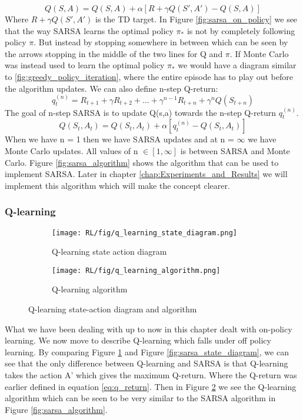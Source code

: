 \begin{equation}
	Q(S,A) = Q(S,A) + \alpha[R+\gamma Q(S',A') - Q(S,A)]
	\label{eq:sarsa_update}
\end{equation}
Where $R+\gamma Q(S',A')$ is the TD target. In Figure \ref{fig:sarsa_on_policy} we see that the way SARSA learns the optimal policy $\pi_{*}$ is not by completely following policy $\pi$. But instead by stopping somewhere in between which can be seen by the arrows stopping in the middle of the two lines for Q and $\pi$. If Monte Carlo was instead used to learn the optimal policy $\pi_{*}$ we would have a diagram similar to \ref{fig:greedy_policy_iteration}, where the entire episode has to play out before the algorithm updates.
We can also define n-step Q-return:
\begin{equation}
	q_{t}^{(n)} = R_{t+1} + \gamma R_{t+2} +...+ \gamma^{n-1}R_{t+n}+\gamma^{n}Q(S_{t+n})
	\label{eq:q_return}
\end{equation}
The goal of n-step SARSA is to update Q(s,a) towards the n-step Q-return $q_t^{(n)}$.
\begin{equation}
	Q(S_t,A_t) = Q(S_t,A_t) + \alpha[q_{t}^{(n)} - Q(S_t,A_t)]
	\label{eq:sarsa_n_step}
\end{equation}
When we have n = 1 then we have SARSA updates and at n = $\infty$ we have Monte Carlo updates. All values of n $\in [1,\infty]$ is between SARSA and Monte Carlo.
Figure \ref{fig:sarsa_algorithm} shows the algorithm that can be used to implement SARSA. Later in chapter \ref{chap:Experiments_and_Results} we will implement this algorithm which will make the concept clearer.
\subsubsection{Q-learning}
\begin{figure}[!htb]
	\begin{subfigure}{0.5\textwidth}
		\centering
		\texttt{[image: RL/fig/q\_learning\_state\_diagram.png]}
		\caption{Q-learning state action diagram\cite{David_Silver}}
		\label{fig:q_learning_state_action_diagram}
	\end{subfigure}
	\begin{subfigure}{0.5\textwidth}
		\centering
		\texttt{[image: RL/fig/q\_learning\_algorithm.png]}
		\caption{Q-learning algorithm\cite{David_Silver}}
		\label{fig:q_learning_algorithm}
	\end{subfigure}
	\caption{Q-learning state-action diagram and algorithm}
	\label{Q-learning}
\end{figure}
What we have been dealing with up to now in this chapter dealt with on-policy learning.
We now move to describe Q-learning which falls under off policy learning. By comparing Figure \ref{fig:q_learning_state_action_diagram} and Figure \ref{fig:sarsa_state_diagram}, we can see that the only difference between Q-learning and SARSA is that Q-learning takes the action A' which gives the maximum Q-return. Where the Q-return was earlier defined in equation \ref{eq:q_return}.
Then in Figure \ref{fig:q_learning_algorithm} we see the Q-learning algorithm which can be seen to be very similar to the SARSA algorithm in Figure \ref{fig:sarsa_algorithm}.
